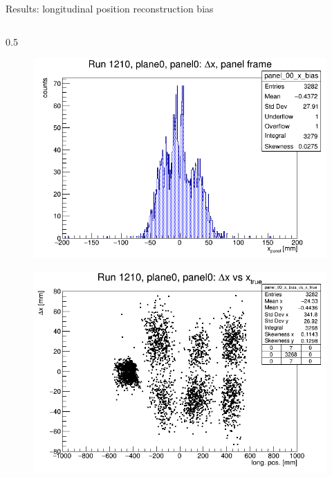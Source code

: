 \documentclass{beamer}[10pt]
\begin{document}
\begin{frame}{Results: longitudinal position reconstruction bias}
  \vspace{-3mm}
  \begin{columns}
    \begin{column}{0.5\framewidth}
      \begin{figure}[H]
        \centering
        \includegraphics[width= \textwidth]{figures/pdf/panel_00_x_bias.png}
        \label{fig:enter-label}
    \end{figure}
    \vspace{-12mm}
    \begin{figure}[H]
      \centering
      \includegraphics[width=  \textwidth]{figures/pdf/panel_00_x_bias_vs_x.png}
      \label{fig:enter-label}
  \end{figure}
     

\end{column}
\end{columns}
\end{frame}
\end{document}
